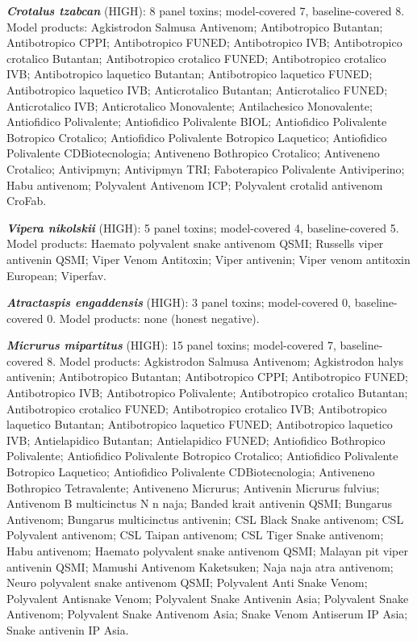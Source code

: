 \documentclass[11pt]{article}
\makeatletter
\renewcommand{\subsection}{\@startsection{subsection}{2}{\z@}{3.25ex plus 1ex minus .2ex}{1.5ex plus .2ex}{\large\bfseries\color{paperblue}}}
\makeatother
\begin{document}
\subsection{Worked examples}
\textbf{\textit{Crotalus tzabcan}} (HIGH): 8 panel toxins; model-covered 7, baseline-covered 8. Model products: Agkistrodon Salmusa Antivenom; Antibotropico Butantan; Antibotropico CPPI; Antibotropico FUNED; Antibotropico IVB; Antibotropico crotalico Butantan; Antibotropico crotalico FUNED; Antibotropico crotalico IVB; Antibotropico laquetico Butantan; Antibotropico laquetico FUNED; Antibotropico laquetico IVB; Anticrotalico Butantan; Anticrotalico FUNED; Anticrotalico IVB; Anticrotalico Monovalente; Antilachesico Monovalente; Antiofidico Polivalente; Antiofidico Polivalente BIOL; Antiofidico Polivalente Botropico Crotalico; Antiofidico Polivalente Botropico Laquetico; Antiofidico Polivalente CDBiotecnologia; Antiveneno Bothropico Crotalico; Antiveneno Crotalico; Antivipmyn; Antivipmyn TRI; Faboterapico Polivalente Antiviperino; Habu antivenom; Polyvalent Antivenom ICP; Polyvalent crotalid antivenom CroFab.\par
\textbf{\textit{Vipera nikolskii}} (HIGH): 5 panel toxins; model-covered 4, baseline-covered 5. Model products: Haemato polyvalent snake antivenom QSMI; Russells viper antivenin QSMI; Viper Venom Antitoxin; Viper antivenin; Viper venom antitoxin European; Viperfav.\par
\textbf{\textit{Atractaspis engaddensis}} (HIGH): 3 panel toxins; model-covered 0, baseline-covered 0. Model products: none (honest negative).\par
\textbf{\textit{Micrurus mipartitus}} (HIGH): 15 panel toxins; model-covered 7, baseline-covered 8. Model products: Agkistrodon Salmusa Antivenom; Agkistrodon halys antivenin; Antibotropico Butantan; Antibotropico CPPI; Antibotropico FUNED; Antibotropico IVB; Antibotropico Polivalente; Antibotropico crotalico Butantan; Antibotropico crotalico FUNED; Antibotropico crotalico IVB; Antibotropico laquetico Butantan; Antibotropico laquetico FUNED; Antibotropico laquetico IVB; Antielapidico Butantan; Antielapidico FUNED; Antiofidico Bothropico Polivalente; Antiofidico Polivalente Botropico Crotalico; Antiofidico Polivalente Botropico Laquetico; Antiofidico Polivalente CDBiotecnologia; Antiveneno Bothropico Tetravalente; Antiveneno Micrurus; Antivenin Micrurus fulvius; Antivenom B multicinctus N n naja; Banded krait antivenin QSMI; Bungarus Antivenom; Bungarus multicinctus antivenin; CSL Black Snake antivenom; CSL Polyvalent antivenom; CSL Taipan antivenom; CSL Tiger Snake antivenom; Habu antivenom; Haemato polyvalent snake antivenom QSMI; Malayan pit viper antivenin QSMI; Mamushi Antivenom Kaketsuken; Naja naja atra antivenom; Neuro polyvalent snake antivenom QSMI; Polyvalent Anti Snake Venom; Polyvalent Antisnake Venom; Polyvalent Snake Antivenin Asia; Polyvalent Snake Antivenom; Polyvalent Snake Antivenom Asia; Snake Venom Antiserum IP Asia; Snake antivenin IP Asia.\par
\end{document}
